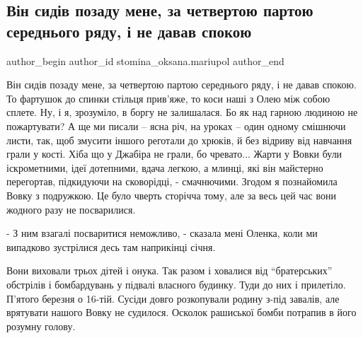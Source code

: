  
 
 
 
 

\subsection{Він сидів позаду мене, за четвертою партою середнього ряду, і не давав спокою}
\label{sec:29_05_2022.fb.stomina_oksana.mariupol.1.vin_sydiv_pozadu_mene}

\ifcmt
 author_begin
   author_id stomina_oksana.mariupol
 author_end
\fi


Він сидів позаду мене, за четвертою партою середнього ряду, і не давав спокою.
То фартушок до спинки стільця прив'яже, то коси наші з Олею між собою сплете.
Ну, і я, зрозуміло, в боргу не залишалася. Бо як над гарною людиною не
пожартувати? А ще ми писали – ясна річ, на уроках  – один одному смішнючи
листи, так, щоб змусити іншого реготали до хрюків,  й без відриву від навчання
грали у кості. Хіба що у Джабіра не грали, бо чревато...  Жарти у Вовки були
іскрометними, ідеї дотепними, вдача легкою, а млинці, які він майстерно
перегортав, підкидуючи на сковорідці, - смачнючими. Згодом я познайомила Вовку
з подружкою. Це було чверть сторічча тому, але за весь цей час вони жодного
разу не посварилися. 


- З ним взагалі посваритися неможливо, - сказала мені Оленка, коли ми
випадково зустрілися десь там  наприкінці січня. 

Вони виховали трьох дітей і онука. Так разом і ховалися від \enquote{братерських}
обстрілів і бомбардувань у підвалі власного будинку. Туди до них і прилетіло.
П'ятого березня о 16-тій. Сусіди довго розкопували родину з-під завалів, але
врятувати нашого Вовку не судилося. Осколок  рашиської бомби потрапив в його
розумну голову. 

